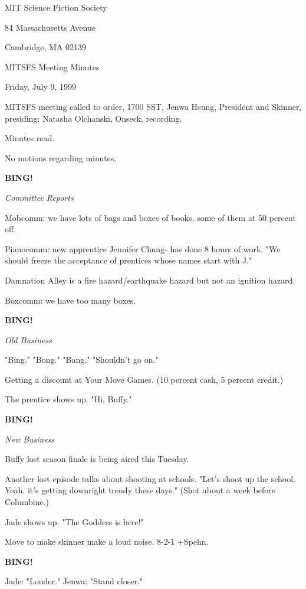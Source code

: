 \documentclass[12pt]{article}
\newcommand{\bing}{{\bf BING!} }
\newcommand{\goto}[1]{\bing \vskip 12pt \centerline{{\em{#1}}}}
\begin{document}
\begin{center}

MIT Science Fiction Society 

84 Massachusetts Avenue

Cambridge, MA 02139

\vspace{12pt}

MITSFS Meeting Minutes 

Friday, July 9, 1999

\end{center}
 
\vspace{18pt}

\setlength{\parskip}{6pt}

\noindent
MITSFS meeting called to order, 1700 SST,
Jenwa Hsung, President and Skinner, presiding; Natasha Olchanski, Onseck, recording.

Minutes read.

No motions regarding minutes.

\goto{Committee Reports}

Mobcomm: we have lots of bags and boxes of books, some of them at 50 percent off.

Pianocomm: new apprentice Jennifer Chung- has done 8 hours of work. "We should freeze the acceptance of prentices whose names start with J."

Damnation Alley is a fire hazard/earthquake hazard but not an ignition hazard.

Boxcomm: we have too many boxes.

\goto{Old Business}

"Bing." "Bong." "Bang." "Shouldn't go on."

Getting a discount at Your Move Games. (10 percent cash, 5 percent credit.)

The prentice shows up. "Hi, Buffy."

\goto{New Business}

Buffy lost season finale is being aired this Tuesday.

Another lost episode talks about shooting at schools. "Let's shoot up the school. Yeah, it's getting downright trendy these days." (Shot about a week before Columbine.)

Jade shows up. "The Goddess is here!"

Move to make skinner make a loud noise. 8-2-1 +Spehn.

\bing

Jade: "Louder." Jenwa: "Stand closer."
\end{document}

